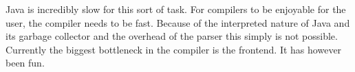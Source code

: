 \documentclass[a4paper,12pt]{report}
\begin{document}
Java is incredibly slow for this sort of task. For compilers to be enjoyable for the user, the compiler needs to be fast. Because of the interpreted nature of Java and its garbage collector and the overhead of the parser this simply is not possible. Currently the biggest bottleneck in the compiler is the frontend. It has however been fun.









\end{document}
